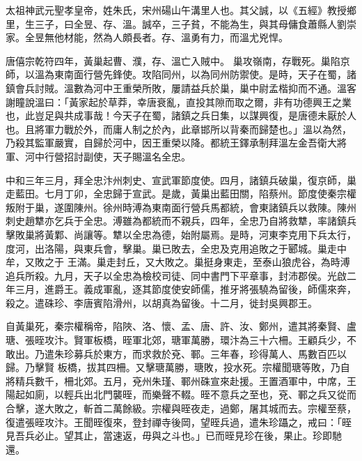 
\begin{pinyinscope}

 太祖神武元聖孝皇帝，姓朱氏，宋州碭山午溝里人也。其父誠，以《五經》教授鄉里，生三子，曰全昱、存、溫。誠卒，三子貧，不能為生，與其母傭食蕭縣人劉崇家。全昱無他材能，然為人頗長者。存、溫勇有力，而溫尤兇悍。



 唐僖宗乾符四年，黃巢起曹、濮，存、溫亡入賊中。
 巢攻嶺南，存戰死。巢陷京師，以溫為東南面行營先鋒使。攻陷同州，以為同州防禦使。是時，天子在蜀，諸鎮會兵討賊。溫數為河中王重榮所敗，屢請益兵於巢，巢中尉孟楷抑而不通。溫客謝瞳說溫曰：「黃家起於草莽，幸唐衰亂，直投其隙而取之爾，非有功德興王之業也，此豈足與共成事哉！今天子在蜀，諸鎮之兵日集，以謀興復，是唐德未厭於人也。且將軍力戰於外，而庸人制之於內，此章邯所以背秦而歸楚也。」溫以為然，乃殺其監軍嚴實，自歸於河中，因王重榮以降。都統王鐸承制拜溫左金吾衛大將
 軍、河中行營招討副使，天子賜溫名全忠。



 中和三年三月，拜全忠汴州刺史、宣武軍節度使。四月，諸鎮兵破巢，復京師，巢走藍田。七月丁卯，全忠歸于宣武。是歲，黃巢出藍田關，陷蔡州。節度使秦宗權叛附于巢，遂圍陳州。徐州時溥為東南面行營兵馬都統，會東諸鎮兵以救陳。陳州刺史趙犨亦乞兵于全忠。溥雖為都統而不親兵，四年，全忠乃自將救犨，率諸鎮兵擊敗巢將黃鄴、尚讓等。犨以全忠為德，始附屬焉。是時，河東李克用下兵太行，度河，出洛陽，與東兵會，擊巢。巢已敗去，全忠及克用追敗之于郾城。巢走中牟，又敗之于
 王滿。巢走封丘，又大敗之。巢挺身東走，至泰山狼虎谷，為時溥追兵所殺。九月，天子以全忠為檢校司徒、同中書門下平章事，封沛郡侯。光啟二年三月，進爵王。義成軍亂，逐其節度使安師儒，推牙將張驍為留後，師儒來奔，殺之。遣硃珍、李唐賓陷滑州，以胡真為留後。十二月，徙封吳興郡王。



 自黃巢死，秦宗權稱帝，陷陜、洛、懷、孟、唐、許、汝、鄭州，遣其將秦賢、盧瑭、張晊攻汴。賢軍板橋，晊軍北郊，瑭軍萬勝，環汴為三十六柵。王顧兵少，不敢出。乃遣朱珍募兵於東方，而求救於兗、鄆。三年春，珍得萬人、馬數百匹以歸。乃擊賢
 板橋，拔其四柵。又擊瑭萬勝，瑭敗，投水死。宗權聞瑭等敗，乃自將精兵數千，柵北郊。五月，兗州朱瑾、鄆州硃宣來赴援。王置酒軍中，中席，王陽起如廁，以輕兵出北門襲晊，而樂聲不輟。晊不意兵之至也，兗、鄆之兵又從而合擊，遂大敗之，斬首二萬餘級。宗權與晊夜走，過鄭，屠其城而去。宗權至蔡，復遣張晊攻汴。王聞晊復來，登封禪寺後岡，望晊兵過，遣朱珍躡之，戒曰：「晊見吾兵必止。望其止，當速返，毋與之斗也。」已而晊見珍在後，果止。珍即馳還。




\end{pinyinscope}

